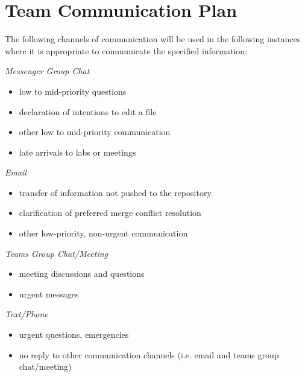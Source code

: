 \documentclass{article}
\begin{document}
\section{Team Communication Plan}

The following channels of communication will be used in the following instances where it is appropriate to communicate the specified information:

\begin{itemize}
	\begin{item}
		\textit{Messenger Group Chat}
		\begin{itemize}
    	\item low to mid-priority questions
    	\item declaration of intentions to edit a file
    	\item other low to mid-priority communication
      \item late arrivals to labs or meetings
    \end{itemize}
  \end{item}

  \begin{item}
    \textit{Email}
    \begin{itemize}
      \item transfer of information not pushed to the repository
      \item clarification of preferred merge conflict resolution
      \item other low-priority, non-urgent communication
    \end{itemize}
  \end{item}

  \begin{item}
    \textit{Teams Group Chat/Meeting}
    \begin{itemize}
      \item meeting discussions and questions
      \item urgent messages
    \end{itemize}
  \end{item}

  \begin{item}
    \textit{Text/Phone}
    \begin{itemize}
      \item urgent questions, emergencies
      \item no reply to other communication channels (i.e. email and teams group chat/meeting)
    \end{itemize}
  \end{item}
\end{itemize}
\end{document}
